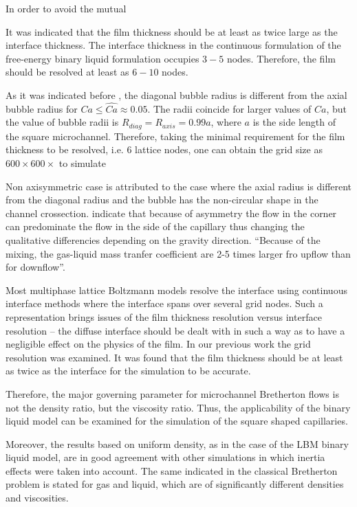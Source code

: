 \documentclass{article}
\begin{document}
 In order to avoid the mutual 


It was indicated that the film thickness should be at least as twice large
as the interface thickness. The interface thickness in the continuous formulation of the
free-energy binary liquid formulation occupies $3-5$ nodes. Therefore, the film should be
resolved at least as $6-10$ nodes. 

As it was indicated before \cite{heil-threedim}, the diagonal bubble radius is different from the
axial bubble radius for $Ca\leq \widehat{Ca}\approx 0.05$. The radii coincide for larger values of
$Ca$, but the value of bubble radii is $R_{diag}=R_{axis}=0.99 a$, where $a$ is the side length of
the square microchannel. Therefore, taking the minimal requirement for the film thickness to be
resolved, i.e. $6$ lattice nodes, one can obtain the grid size as $600\times 600 \times $ to
simulate 

Non axisymmetric case is attributed to the case where the axial radius is different from the
diagonal radius and the bubble has the non-circular shape in the channel crossection. 
{\color{red}
\citet{cerro-space} indicate that because of asymmetry the flow in the corner can predominate the
flow in the side of the capillary thus changing the qualitative differencies depending on the
gravity direction. ``Because of the mixing, the gas-liquid mass tranfer coefficient are 2-5 times
larger fro upflow than for downflow''. 
}

Most multiphase lattice Boltzmann models \cite{swift, Shan-chen:extended} resolve
the interface using continuous interface methods where the interface spans over several grid nodes.
Such a representation
brings issues of the film thickness resolution versus interface
resolution -- the diffuse interface should be dealt with in such a way as to have a
negligible effect on the physics of the film. In our previous work \citet{kuzmin-binary2d} the grid
resolution was examined. It was found that the film thickness should be at least as twice as the
interface for the simulation to be accurate.



Therefore, the major governing parameter for microchannel Bretherton flows is not the density ratio,
but the
viscosity ratio. Thus, the applicability of the binary liquid model can be examined for the
simulation of the square shaped capillaries.

 Moreover, the results based on uniform density, as in the case of the LBM
binary liquid model, are in good agreement with other simulations
\cite{giavedoni-numerical,heil-bretherton} in which inertia effects were taken into account. The
same indicated in \cite{gupta-review} the  classical Bretherton problem is stated for
gas and liquid, which are of
significantly
different densities and viscosities.
\end{document}
